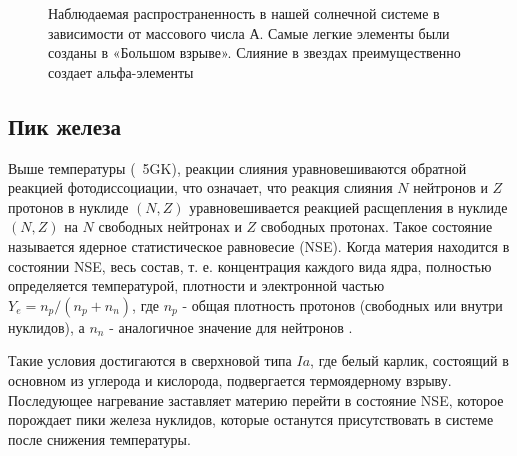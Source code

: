 \documentclass[%
master,    %
natbib,      %
subf,        %
href,        %
colorlinks,  %
]{disser}
\begin{document}
\begin{figure}[h]
	\caption{Наблюдаемая распространенность в нашей солнечной системе в зависимости от массового числа А. Самые легкие элементы были созданы в «Большом взрыве». Слияние в звездах преимущественно создает альфа-элементы \cite{abundancies}}
	\label{ris:abundancies}
\end{figure}

\subsection{Пик железа}

Выше температуры (~5GK), реакции слияния уравновешиваются обратной реакцией фотодиссоциации, что означает, что реакция слияния $N$ нейтронов и $Z$ протонов в нуклиде $(N, Z)$ уравновешивается реакцией расщепления в нуклиде $(N, Z)$ на $N$ свободных нейтронах и $Z$ свободных протонах. Такое состояние называется ядерное статистическое равновесие (NSE). Когда материя находится в состоянии NSE, весь состав, т. е. концентрация каждого вида ядра, полностью определяется температурой, плотности и электронной частью $Y_e = n_p/(n_p + n_n)$, где $n_p$ - общая плотность протонов (свободных или внутри нуклидов), а $n_n$ - аналогичное значение для нейтронов \cite{nse}.

Такие условия достигаются в сверхновой типа $Ia$, где белый карлик, состоящий в основном из углерода и кислорода, подвергается термоядерному взрыву. Последующее нагревание заставляет материю перейти в состояние NSE, которое порождает пики железа нуклидов, которые останутся присутствовать в системе после снижения температуры.
\end{document}

